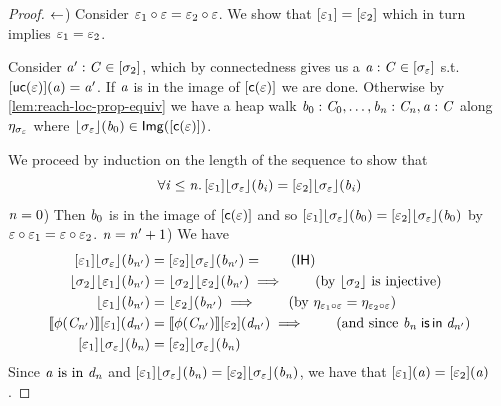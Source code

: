 \begin{proof}
    $\leftarrow$) Consider $\varepsilon_1 \circ \varepsilon = \varepsilon_2 \circ \varepsilon$.
             We show that $[\varepsilon_1] = [\varepsilon_2]$ which in turn implies $\varepsilon_1 = \varepsilon_2$.

             Consider $\mathit{a}' : \mathit{C} \in [\sigma_2]$, which by connectedness gives us a $\mathit{a} : \mathit{C} \in [\sigma_\varepsilon]$ s.t. $[\mathsf{uc}(\varepsilon)](\mathit{a}) = \mathit{a}'$.
             If $\mathit{a}$ is in the image of $[\mathsf{c}(\varepsilon)]$ we are done.
             Otherwise by \cref{lem:reach-loc-prop-equiv} we have a heap walk $\mathit{b}_0 : \mathit{C}_0, \hdots, \mathit{b}_{\mathit{n}} : \mathit{C}_{\mathit{n}}, \mathit{a} : \mathit{C}$
             along $\eta_{\sigma_\varepsilon}$ where $\lfloor\sigma_\varepsilon\rfloor(\mathit{b}_0) \in \mathsf{Img}([\mathsf{c}(\varepsilon)])$.

             We proceed by induction on the length of the sequence to show that 
             \[ \forall \mathit{i} \le \mathit{n}.\, [\varepsilon_1]\lfloor\sigma_\varepsilon\rfloor(\mathit{b}_{\mathit{i}}) = [\varepsilon_2]\lfloor\sigma_\varepsilon\rfloor(\mathit{b}_{\mathit{i}}) \]
             $\mathit{n} = 0$) Then $\mathit{b}_0$ is in the image of $[\mathsf{c}(\varepsilon)]$ and so $[\varepsilon_1]\lfloor\sigma_\varepsilon\rfloor(\mathit{b}_0) = [\varepsilon_2]\lfloor\sigma_\varepsilon\rfloor(\mathit{b}_0)$
                        by $\varepsilon \circ \varepsilon_1 = \varepsilon \circ \varepsilon_2$.\nl
             $\mathit{n} = \mathit{n}' + 1$) 
                        We have
                        \begin{align*}
                            \anyL{\me_1}\concL{\sigma_\me}(\vb_{\vn'}) &= \anyL{\me_2}\concL{\sigma_\me}(\vb_{\vn'}) = \tag{$\mathsf{IH}$} \\
                            \concL{\sigma_2}\concL{\me_1}(\vb_{\vn'})  &= \concL{\sigma_2}\concL{\me_2}(\vb_{\vn'}) \implies \tag{by $\concL{\sigma_2}$ is injective} \\
                            \concL{\me_1}(\vb_{\vn'})                  &= \concL{\me_2}(\vb_{\vn'}) \implies        \tag{by $\mvarM_{\me_1 \comp \me} = \mvarM_{\me_2 \comp \me}$} \\
                            \sem{\phi(\vC_{\vn'})}\anyL{\me_1}(\vd_{\vn'})  &= \sem{\phi(\vC_{\vn'})}\anyL{\me_2}(\vd_{\vn'}) \implies  \tag{and since $\vb_\vn \isIn \vd_{\vn'}$} \\
                            \anyL{\me_1}\concL{\sigma_\me}(\vb_\vn)    &= \anyL{\me_2}\concL{\sigma_\me}(\vb_\vn)                       
                        \end{align*}
             Since $\mathit{a} \text{ is in } \mathit{d}_{\mathit{n}}$ and $[\varepsilon_1]\lfloor\sigma_\varepsilon\rfloor(\mathit{b}_{\mathit{n}}) = [\varepsilon_2]\lfloor\sigma_\varepsilon\rfloor(\mathit{b}_{\mathit{n}})$,
             we have that $[\varepsilon_1](\mathit{a}) = [\varepsilon_2](\mathit{a})$.
\end{proof}


